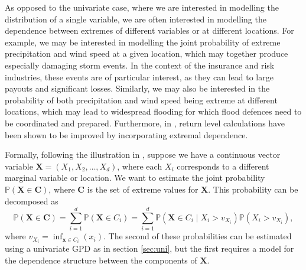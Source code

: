 \documentclass{article}
\numberwithin{equation}{section}
\begin{document}

As opposed to the univariate case, where we are interested in modelling the distribution of a single variable, we are often interested in modelling the dependence between extremes of different variables or at different locations.
For example, we may be interested in modelling the joint probability of extreme precipitation and wind speed at a given location, which may together produce especially damaging storm events.
In the context of the insurance and risk industries, these events are of particular interest, as they can lead to large payouts and significant losses.
Similarly, we may also be interested in the probability of both precipitation and wind speed being extreme at different locations, which may lead to widespread flooding for which flood defences need to be coordinated and prepared.
Furthermore, in \citet{Zhang2024}, return level calculations have been shown to be improved by incorporating extremal dependence.

Formally, following the illustration in \citet{Heffernan2004}, suppose we have a continuous vector variable $\bm{X} = (X_1, X_2, \ldots, X_d)$, where each $X_i$ corresponds to a different marginal variable or location.
We want to estimate the joint probability $\mathbb{P}(\bm{X} \in \bm{C})$, where $\bm{C}$ is the set of extreme values for $\bm{X}$.
This probability can be decomposed as
\begin{equation} \label{eq:decomp}
  \mathbb{P}(\bm{X} \in \bm{C}) = \sum_{i=1}^{d}{\mathbb{P}(\bm{X} \in C_i)} = \sum_{i=1}^{d}{\mathbb{P}(\bm{X} \in C_i \mid X_i > v_{X_i}) \mathbb{P}(X_i > v_{X_i})},
\end{equation}
where $v_{X_i} = \inf_{\bm{x} \in C_i}(x_i)$.
The second of these probabilities can be estimated using a univariate GPD as in section \ref{sec:uni}, but the first requires a model for the dependence structure between the components of $\bm{X}$.
\end{document}
